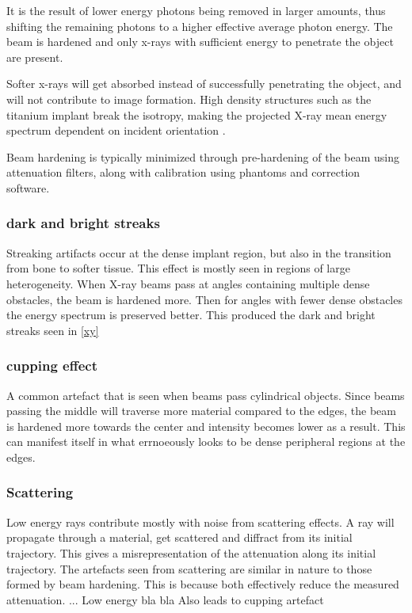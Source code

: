 It is the result of lower energy photons being removed in larger amounts, thus
shifting the remaining photons to a higher effective average photon energy. The beam is hardened and only x-rays with sufficient energy to penetrate the object are present.

Softer x-rays will get absorbed instead of successfully penetrating the object,
and will not contribute to image formation. High density structures such as the titanium implant break the isotropy, making the projected X-ray mean energy spectrum dependent on incident orientation \citep{srnoise}.

Beam hardening is typically minimized through pre-hardening of the beam using attenuation filters, along with calibration using phantoms and correction software.

\subsubsection{dark and bright streaks}

Streaking artifacts occur at the dense implant region, but also in the transition from bone to softer tissue.
This effect is mostly seen in regions of large heterogeneity. When X-ray beams pass at angles containing multiple dense obstacles, the beam is hardened more. Then for angles with fewer dense obstacles the energy spectrum is preserved better. This produced the dark and bright streaks seen in \cref{xy}

\subsubsection{cupping effect}

A common artefact that is seen when beams pass cylindrical objects. Since beams passing the middle will traverse more material compared to the edges, the beam is hardened more towards the center and intensity becomes lower as a result. This can manifest itself in what errnoeously looks to be dense peripheral regions at the edges.

\subsubsection{Scattering}

Low energy rays contribute mostly with noise from scattering effects. A ray will propagate through a material, get scattered and diffract from its initial trajectory. This gives a misrepresentation of the attenuation along its initial trajectory.
The artefacts seen from scattering are similar in nature to those formed by beam hardening. This is because both effectively reduce the measured attenuation. ... Low energy bla bla
Also leads to cupping artefact

